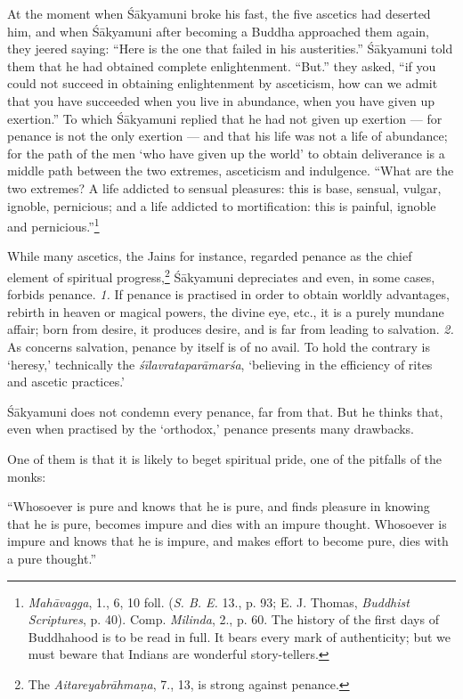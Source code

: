 \documentclass[a4paper, 11pt, oneside, english, landscape]{article}
\begin{document}
At the moment when Śākyamuni broke his fast, the five ascetics had deserted him, and when Śākyamuni after becoming a Buddha approached them again, they jeered saying: ``Here is the one that failed in his austerities.'' Śākyamuni told them that he had obtained complete enlightenment. ``But.'' they asked, ``if you could not succeed in obtaining enlightenment by asceticism, how can we admit that you have succeeded when you live in abundance, when you have given up exertion.'' To which Śākyamuni replied that he had not given up exertion --- for penance is not the only exertion --- and that his life was not a life of abundance; for the path of the men `who have given up the world' to obtain deliverance is a middle path between the two extremes, asceticism and indulgence. ``What are the two extremes? A life addicted to sensual pleasures: this is base, sensual, vulgar, ignoble, pernicious; and a life addicted to mortification: this is painful, ignoble and pernicious.''\footnote{\emph{Mahāvagga}, 1., 6, 10 foll. (\emph{S. B. E.} 13., p. 93; E. J. Thomas, \emph{Buddhist Scriptures}, p. 40). Comp. \emph{Milinda}, 2., p. 60. The history of the first days of Buddhahood is to be read in full. It bears every mark of authenticity; but we must beware that Indians are wonderful story-tellers.}

While many ascetics, the Jains for instance, regarded penance as the chief element of spiritual progress,\footnote{The \emph{Aitareyabrāhmaṇa}, 7., 13, is strong against penance.} Śākyamuni depreciates and even, in some cases, forbids penance. \emph{1.} If penance is practised in order to obtain worldly advantages, rebirth in heaven or magical powers, the divine eye, etc., it is a purely mundane affair; born from desire, it produces desire, and is far from leading to salvation. \emph{2.} As concerns salvation, penance by itself is of no avail. To hold the contrary is `heresy,' technically the \emph{śīlavrataparāmarśa}, `believing in the efficiency of rites and ascetic practices.'

Śākyamuni does not condemn every penance, far from that. But he thinks that, even when practised by the `orthodox,' penance presents many drawbacks.

One of them is that it is likely to beget spiritual pride, one of the pitfalls of the monks:

``Whosoever is pure and knows that he is pure, and finds pleasure in knowing that he is pure, becomes impure and dies with an impure thought. Whosoever is impure and knows that he is impure, and makes effort to become pure, dies with a pure thought.''
\end{document}
